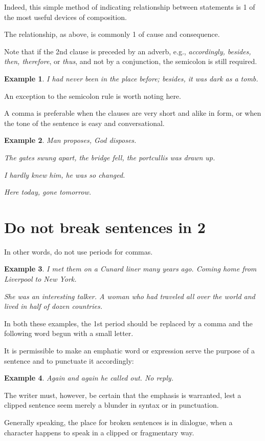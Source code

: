 \documentclass{book}
\numberwithin{equation}{section}
\newtheorem{example}{Example}[chapter]
\begin{document}
Indeed, this simple method of indicating relationship between statements is 1 of the most useful devices of composition.

The relationship, as above, is commonly 1 of cause and consequence.

%
Note that if the 2nd clause is preceded by an adverb, e.g., \textit{accordingly, besides, then, therefore}, or \textit{thus}, and not by a conjunction, the semicolon is still required.
\begin{example}
    I had never been in the place before; besides, it was dark as a tomb.
\end{example}
An exception to the semicolon rule is worth noting here.

A comma is preferable when the clauses are very short and alike in form, or when the tone of the sentence is easy and conversational.
\begin{example}
    Man proposes, God disposes.
    
    The gates swung apart, the bridge fell, the portcullis was drawn up.
    
    I hardly knew him, he was so changed.
    
    Here today, gone tomorrow.
\end{example}

\section{Do not break sentences in 2}
In other words, do not use periods for commas.
\begin{example}
    I met them on a Cunard liner many years ago. Coming home from Liverpool to New York.
    
    She was an interesting talker. A woman who had traveled all over the world and lived in half of dozen countries.
\end{example}
In both these examples, the 1st period should be replaced by a comma and the following word begun with a small letter.

%
It is permissible to make an emphatic word or expression serve the purpose of a sentence and to punctuate it accordingly:
\begin{example}
    Again and again he called out. No reply.
\end{example}
The writer must, however, be certain that the emphasis is warranted, lest a clipped sentence seem merely a blunder in syntax or in punctuation.

Generally speaking, the place for broken sentences is in dialogue, when a character happens to speak in a clipped or fragmentary way.
\end{document}
